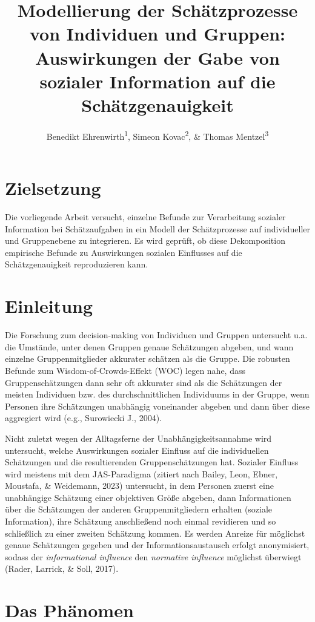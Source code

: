 \documentclass[
  man,mask,floatsintext]{apa6}
\title{Modellierung der Schätzprozesse von Individuen und Gruppen: Auswirkungen der Gabe von sozialer Information auf die Schätzgenauigkeit}
\author{Benedikt Ehrenwirth\textsuperscript{1}, Simeon Kovac\textsuperscript{2}, \& Thomas Mentzel\textsuperscript{3}}
\date{}
\affiliation{\vspace{0.5cm}\textsuperscript{1} Ludwig-Maximilians-Universität München (LMU)\\\textsuperscript{2} Ludwig-Maximilians-Universität München (LMU)\\\textsuperscript{3} Ludwig-Maximilians-Universität München (LMU)}
\begin{document}
\maketitle

\section{Zielsetzung}\label{zielsetzung}

Die vorliegende Arbeit versucht, einzelne Befunde zur Verarbeitung sozialer Information bei Schätzaufgaben in ein Modell der Schätzprozesse auf individueller und Gruppenebene zu integrieren. Es wird geprüft, ob diese Dekomposition empirische Befunde zu Auswirkungen sozialen Einflusses auf die Schätzgenauigkeit reproduzieren kann.

\section{Einleitung}\label{einleitung}

Die Forschung zum decision-making von Individuen und Gruppen untersucht u.a. die Umstände, unter denen Gruppen genaue Schätzungen abgeben, und wann einzelne Gruppenmitglieder akkurater schätzen als die Gruppe. Die robusten Befunde zum Wisdom-of-Crowds-Effekt (WOC) legen nahe, dass Gruppenschätzungen dann sehr oft akkurater sind als die Schätzungen der meisten Individuen bzw. des durchschnittlichen Individuums in der Gruppe, wenn Personen ihre Schätzungen unabhängig voneinander abgeben und dann über diese aggregiert wird (e.g., Surowiecki J., 2004).

Nicht zuletzt wegen der Alltagsferne der Unabhängigkeitsannahme wird untersucht, welche Auswirkungen sozialer Einfluss auf die individuellen Schätzungen und die resultierenden Gruppenschätzungen hat. Sozialer Einfluss wird meistens mit dem JAS-Paradigma (zitiert nach Bailey, Leon, Ebner, Moustafa, \& Weidemann, 2023) untersucht, in dem Personen zuerst eine unabhängige Schätzung einer objektiven Größe abgeben, dann Informationen über die Schätzungen der anderen Gruppenmitgliedern erhalten (soziale Information), ihre Schätzung anschließend noch einmal revidieren und so schließlich zu einer zweiten Schätzung kommen. Es werden Anreize für möglichst genaue Schätzungen gegeben und der Informationsaustausch erfolgt anonymisiert, sodass der \emph{informational influence} den \emph{normative influence} möglichst überwiegt (Rader, Larrick, \& Soll, 2017).

\section{Das Phänomen}\label{das-phuxe4nomen}
\end{document}
